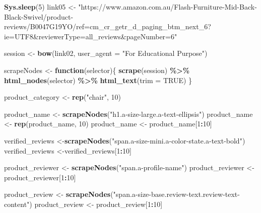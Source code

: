 \documentclass[
]{article}
\newenvironment{Shaded}{\begin{snugshade}}{\end{snugshade}}
\newcommand{\AttributeTok}[1]{\textcolor[rgb]{0.13,0.29,0.53}{#1}}
\newcommand{\ConstantTok}[1]{\textcolor[rgb]{0.56,0.35,0.01}{#1}}
\newcommand{\ControlFlowTok}[1]{\textcolor[rgb]{0.13,0.29,0.53}{\textbf{#1}}}
\newcommand{\DecValTok}[1]{\textcolor[rgb]{0.00,0.00,0.81}{#1}}
\newcommand{\FunctionTok}[1]{\textcolor[rgb]{0.13,0.29,0.53}{\textbf{#1}}}
\newcommand{\NormalTok}[1]{#1}
\newcommand{\OtherTok}[1]{\textcolor[rgb]{0.56,0.35,0.01}{#1}}
\newcommand{\SpecialCharTok}[1]{\textcolor[rgb]{0.81,0.36,0.00}{\textbf{#1}}}
\newcommand{\StringTok}[1]{\textcolor[rgb]{0.31,0.60,0.02}{#1}}
\begin{document}
\begin{Shaded}
\begin{Highlighting}[]
   \FunctionTok{Sys.sleep}\NormalTok{(}\DecValTok{5}\NormalTok{)}
\NormalTok{link05 }\OtherTok{\textless{}{-}} \StringTok{"https://www.amazon.com.au/Flash{-}Furniture{-}Mid{-}Back{-}Black{-}Swivel/product{-}reviews/B0047G19YO/ref=cm\_cr\_getr\_d\_paging\_btm\_next\_6?ie=UTF8\&reviewerType=all\_reviews\&pageNumber=6"}


\NormalTok{  session }\OtherTok{\textless{}{-}} \FunctionTok{bow}\NormalTok{(link02,}
               \AttributeTok{user\_agent =} \StringTok{"For Educational Purpose"}\NormalTok{)}

\NormalTok{  scrapeNodes }\OtherTok{\textless{}{-}} \ControlFlowTok{function}\NormalTok{(selector)\{}
    \FunctionTok{scrape}\NormalTok{(session) }\SpecialCharTok{\%\textgreater{}\%}
      \FunctionTok{html\_nodes}\NormalTok{(selector) }\SpecialCharTok{\%\textgreater{}\%}
      \FunctionTok{html\_text}\NormalTok{(}\AttributeTok{trim =} \ConstantTok{TRUE}\NormalTok{)}
\NormalTok{  \}}

\NormalTok{  product\_category }\OtherTok{\textless{}{-}} \FunctionTok{rep}\NormalTok{(}\StringTok{"chair"}\NormalTok{, }\DecValTok{10}\NormalTok{)}

\NormalTok{  product\_name }\OtherTok{\textless{}{-}} \FunctionTok{scrapeNodes}\NormalTok{(}\StringTok{"h1.a{-}size{-}large.a{-}text{-}ellipsis"}\NormalTok{)}
\NormalTok{  product\_name }\OtherTok{\textless{}{-}} \FunctionTok{rep}\NormalTok{(product\_name, }\DecValTok{10}\NormalTok{)}
\NormalTok{  product\_name }\OtherTok{\textless{}{-}}\NormalTok{ product\_name[}\DecValTok{1}\SpecialCharTok{:}\DecValTok{10}\NormalTok{]}
  
\NormalTok{  verified\_reviews }\OtherTok{\textless{}{-}}\FunctionTok{scrapeNodes}\NormalTok{(}\StringTok{"span.a{-}size{-}mini.a{-}color{-}state.a{-}text{-}bold"}\NormalTok{)}
\NormalTok{  verified\_reviews }\OtherTok{\textless{}{-}}\NormalTok{verified\_reviews[}\DecValTok{1}\SpecialCharTok{:}\DecValTok{10}\NormalTok{]}
  
\NormalTok{  product\_reviewer }\OtherTok{\textless{}{-}} \FunctionTok{scrapeNodes}\NormalTok{(}\StringTok{"span.a{-}profile{-}name"}\NormalTok{)}
\NormalTok{  product\_reviewer }\OtherTok{\textless{}{-}}\NormalTok{ product\_reviewer[}\DecValTok{1}\SpecialCharTok{:}\DecValTok{10}\NormalTok{]}
  
\NormalTok{  product\_review }\OtherTok{\textless{}{-}} \FunctionTok{scrapeNodes}\NormalTok{(}\StringTok{"span.a{-}size{-}base.review{-}text.review{-}text{-}content"}\NormalTok{)}
\NormalTok{  product\_review }\OtherTok{\textless{}{-}}\NormalTok{ product\_review[}\DecValTok{1}\SpecialCharTok{:}\DecValTok{10}\NormalTok{]}
  

\end{Highlighting}
\end{Shaded}
\end{document}
